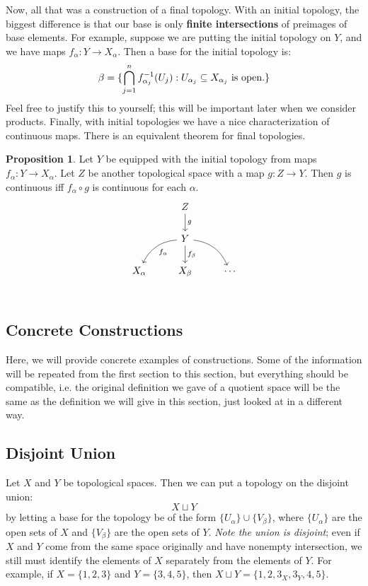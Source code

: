 \documentclass[11pt, oneside]{amsart}   	%
\theoremstyle{definition}
\newtheorem{prop}{Proposition}[section]
\begin{document}
	Now, all that was a construction of a final topology. With an initial topology, the biggest difference is that our base is only 
	\textbf{finite intersections} of preimages of base elements. For example, suppose we are putting the initial topology on 
	$Y$, and we have maps $f_\alpha : Y\rightarrow X_\alpha$. Then a base for the initial topology is:
	$$
		\beta = \{\bigcap_{j = 1}^n f_{\alpha_j}^{-1}(U_j) : U_{\alpha_j}\subseteq X_{\alpha_j}\textnormal{ is open.}\}
	$$
	Feel free to justify this to yourself; this will be important later when we consider products. Finally, with initial topologies we 
	have a nice characterization of continuous maps. There is an equivalent theorem for final topologies.
	
	\begin{prop}
		Let $Y$ be equipped with the initial topology from maps $f_\alpha : Y\rightarrow X_\alpha$. Let $Z$ be another 
		topological space with a map $g : Z\rightarrow Y$. Then $g$ is continuous iff $f_\alpha\circ g$ is continuous for each 
		$\alpha$.
		\[
		\begin{tikzcd}
			{} & Z \arrow[d, "g"] & {} \\
			{} & Y \arrow[ld, bend right, "f_\alpha"] \arrow[d, "f_\beta"] \arrow[rd, bend left] & {} \\
			X_\alpha & X_\beta & \cdots \\
		\end{tikzcd}
		\]
	\end{prop}	
	
	\subsection{Concrete Constructions}

	Here, we will provide concrete examples of constructions. Some of the information will be repeated from the first section to this section, but everything should 
	be compatible, i.e. the original definition we gave of a quotient space will be the same as the definition we will give in this section, just looked at in a different 
	way. 
	
	\subsection{Disjoint Union}
	
	Let $X$ and $Y$ be topological spaces. Then we can put a topology on the disjoint union:
	$$
		X\sqcup Y
	$$
	by letting a base for the topology be of the form $\{U_\alpha\}\cup\{V_\beta\}$, where $\{U_\alpha\}$ are the open sets of $X$ and $\{V_\beta\}$ are the open 
	sets of $Y$. \textit{Note the union is disjoint}; even if $X$ and $Y$ come from the same space originally and have nonempty intersection, we still must 
	identify the elements of $X$ separately from the elements of $Y$. For example, if $X = \{1, 2, 3\}$ and $Y = \{3, 4, 5\}$, then $X\sqcup Y = \{1, 2, 3_X, 3_Y, 
	4, 5\}$.
	
\end{document}
